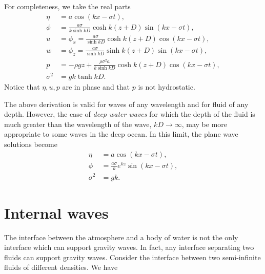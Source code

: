 \sourcepagebreak

For completeness, we take the real parts
\begin{align*}
	\eta     & =a\cos(kx-\sigma t),                                                    \\
	\phi     & =\frac{a\sigma}{k\sinh kD}\cosh k(z+D)\sin(kx-\sigma t),                \\
	u        & =\phi_x=\frac{a\sigma}{\sinh kD}\cosh k(z+D)\cos(kx-\sigma t),          \\
	w        & =\phi_z=\frac{a\sigma}{\sinh kD}\sinh k(z+D)\sin(kx-\sigma t),          \\
	p        & =-\rho gz+\frac{\rho\sigma^2a}{k\sinh kD}\cosh k(z+D)\cos(kx-\sigma t), \\
	\sigma^2 & =gk\tanh kD.
\end{align*}
Notice that $\eta,u,p$ are in phase and that $p$ is not hydrostatic.

The above derivation is valid for waves of any wavelength and for fluid of any
depth. However, the case of \emph{deep water waves} for which the depth of the fluid is much
greater than the wavelength of the wave, $kD\to\infty$, may be more appropriate to some
waves in the deep ocean. In this limit, the plane wave solutions become
\begin{align*}
	\eta     & =a\cos(kx-\sigma t),                       \\
	\phi     & =\frac{a\sigma}{k}e^{kz}\sin(kx-\sigma t), \\
	\sigma^2 & =gk.
\end{align*}

\section{Internal waves}

The interface between the atmosphere and a body of water is not the only interface
which can support gravity waves. In fact, any interface separating two fluids can
support gravity waves. Consider the interface between two semi-infinite fluids of
different densities. We have

\sourcepagebreak


